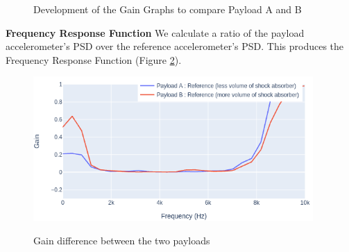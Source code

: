 \begin{figure}[!h]
    \raggedright
    
    \caption{Development of the Gain Graphs to compare Payload A and B}
    \label{fig:PSD}
\end{figure}

\textbf{Frequency Response Function} We calculate a ratio of the payload accelerometer's PSD over the reference accelerometer's PSD. This produces the Frequency Response Function (Figure \ref{fig:FRF}).

\begin{figure}[!h]
    \raggedright
    {\includegraphics[height=5.5cm]{images/stage_system/design_graphs/freqresponse_payload_crop.png}}

    \caption{Gain difference between the two payloads}
    \label{fig:FRF}
\end{figure}

